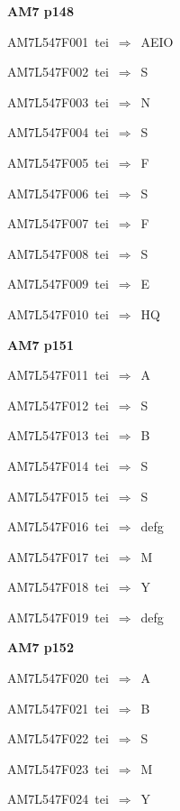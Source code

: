 \par\vfill\eject
{\bf\hfill AM7 p148\hfill\hbox{}}\par\bigskip
{\sixrm AM7L547F001\ {\sixit tei}\ }$\Rightarrow$\ AEIO\par\smallskip
{\sixrm AM7L547F002\ {\sixit tei}\ }$\Rightarrow$\ S\par\smallskip
{\sixrm AM7L547F003\ {\sixit tei}\ }$\Rightarrow$\ N\par\smallskip
{\sixrm AM7L547F004\ {\sixit tei}\ }$\Rightarrow$\ S\par\smallskip
{\sixrm AM7L547F005\ {\sixit tei}\ }$\Rightarrow$\ F\par\smallskip
{\sixrm AM7L547F006\ {\sixit tei}\ }$\Rightarrow$\ S\par\smallskip
{\sixrm AM7L547F007\ {\sixit tei}\ }$\Rightarrow$\ F\par\smallskip
{\sixrm AM7L547F008\ {\sixit tei}\ }$\Rightarrow$\ S\par\smallskip
{\sixrm AM7L547F009\ {\sixit tei}\ }$\Rightarrow$\ E\par\smallskip
{\sixrm AM7L547F010\ {\sixit tei}\ }$\Rightarrow$\ HQ\par\smallskip

\par\vfill\eject
{\bf\hfill AM7 p151\hfill\hbox{}}\par\bigskip
{\sixrm AM7L547F011\ {\sixit tei}\ }$\Rightarrow$\ A\par\smallskip
{\sixrm AM7L547F012\ {\sixit tei}\ }$\Rightarrow$\ S\par\smallskip
{\sixrm AM7L547F013\ {\sixit tei}\ }$\Rightarrow$\ B\par\smallskip
{\sixrm AM7L547F014\ {\sixit tei}\ }$\Rightarrow$\ S\par\smallskip
{\sixrm AM7L547F015\ {\sixit tei}\ }$\Rightarrow$\ S\par\smallskip
{\sixrm AM7L547F016\ {\sixit tei}\ }$\Rightarrow$\ {\tenit defg}\par\smallskip
{\sixrm AM7L547F017\ {\sixit tei}\ }$\Rightarrow$\ M\par\smallskip
{\sixrm AM7L547F018\ {\sixit tei}\ }$\Rightarrow$\ Y\par\smallskip
{\sixrm AM7L547F019\ {\sixit tei}\ }$\Rightarrow$\ {\tenit defg}\par\smallskip

\par\vfill\eject
{\bf\hfill AM7 p152\hfill\hbox{}}\par\bigskip
{\sixrm AM7L547F020\ {\sixit tei}\ }$\Rightarrow$\ A\par\smallskip
{\sixrm AM7L547F021\ {\sixit tei}\ }$\Rightarrow$\ B\par\smallskip
{\sixrm AM7L547F022\ {\sixit tei}\ }$\Rightarrow$\ S\par\smallskip
{\sixrm AM7L547F023\ {\sixit tei}\ }$\Rightarrow$\ M\par\smallskip
{\sixrm AM7L547F024\ {\sixit tei}\ }$\Rightarrow$\ Y\par\smallskip

